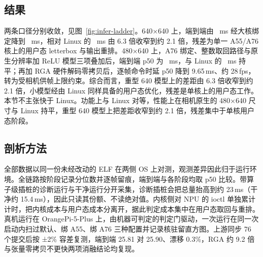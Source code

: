 \subsection{结果}

两条口径分别收敛，见图~\ref{fig:infer-ladder}。640×640 上，端到端由 \nEteDefault~ms 经大核绑定降到 \nEteBig~ms，相对 Linux 的 \nEteBigLin~ms 由 6.3 倍收窄到约 2.1 倍，残差为单一 A55/A76 核上的用户态 letterbox 与输出重排。480×640 上，A76 绑定、整数取回路径与原生分辨率加 ReLU 模型三项叠加后，端到端 p50 为 \nInferTennis~ms，与 Linux 的 \nInferTennisLin~ms 持平；再加 RGA 硬件解码零拷贝后，逐帧命令时延 p50 降到 9.65\,ms、约 28\,fps，转为受相机供帧上限约束。综合而言，重型 640 模型上的差距由 6.3 倍收窄到约 2.1 倍，小模型经由 Linux 同样具备的用户态优化，残差是单核上的用户态工作。本节不主张快于 Linux。功能上与 Linux 对等，性能上在相机原生的 480×640 尺寸与 Linux 持平，重型 640 模型上把差距收窄到约 2.1 倍，残差集中于单核用户态阶段。

\subsection{剖析方法}

全部数据以同一份未经改动的 ELF 在两侧 OS 上对测，观测差异因此归于运行环境。全链路按阶段记录分位数并逐帧留痕，端到端与各阶段均取 p50 比较。带算子级插桩的诊断运行与干净运行分开采集，诊断插桩会把总量抬高到约 23\,ms（干净约 15.4\,ms），因此只读其份额、不读绝对值。内核侧对 NPU 的 ioctl 单独累计计时，把内核成本与用户态成本分离开，据此判定成本集中在用户态取回与重排。真机运行在 OrangePi-5-Plus 上，由机器可判定的判定门驱动，一次运行在同一次启动内扫过默认、绑 A55、绑 A76 三种配置并记录核驻留直方图。上游同步 76 个提交后按 ±2\% 容差复测，端到端 25.81 对 25.90、漂移 0.3\%，RGA 约 9.2 倍与张量零拷贝不更快两项消融结论均复现。
